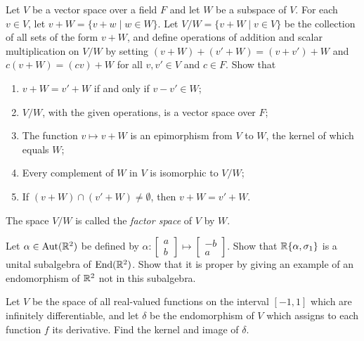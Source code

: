 \begin{problem}[Golan 307]
Let $V$ be a vector space over a field $F$ and let $W$ be a subspace of $V$.  
For each $v \in V$, let $v + W = \{v+w \mid w \in W\}$.  Let 
$V/W = \{v+W \mid v \in V\}$ be the collection of all sets of the form $v+W$,
and define operations of addition and scalar multiplication on $V/W$ by 
setting $(v+W) + (v'+W) = (v+v')+W$ and $c(v+W) = (cv)+W$ for all $v, v' \in V$
and $c\in F$.  Show that
\begin{enumerate}
\item $v+W = v'+W$ if and only if $v-v'\in W$;
\item $V/W$, with the given operations, is a vector space over $F$;
\item The function $v\mapsto v+W$ is an epimorphism from $V$ to $W$,
the kernel of which equals $W$;
\item Every complement of $W$ in $V$ is isomorphic to $V/W$;
\item If $(v+W)\cap (v'+W) \neq \emptyset$, then $v+W = v'+W$.
\end{enumerate}
The space $V/W$ is called the \emph{factor space} of $V$ by $W$.
\end{problem}

\probskip

\begin{problem}[Golan 325]
Let $\alpha \in \operatorname{Aut}(\mathbb{R}^2)$ be defined by 
$\alpha: 
\begin{bmatrix} a\\ b \end{bmatrix} 
\mapsto 
\begin{bmatrix} -b\\ a \end{bmatrix}$.
Show that $\mathbb{R}\{\alpha, \sigma_1\}$ is a unital subalgebra of $\operatorname{End}(\mathbb{R}^2)$.  Show
that it is proper by giving an example of an endomorphism of $\mathbb{R}^2$ not in this
subalgebra. 
\end{problem}

\probskip

\begin{problem}[Golan 326]
Let $V$ be the space of all real-valued functions on the interval $[-1, 1]$
which are infinitely differentiable, and let $\delta$ be the endomorphism of $V$
which assigns to each function $f$ its derivative.  Find the kernel and image of
$\delta$. 
\end{problem}

